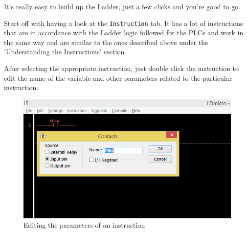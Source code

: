 \documentclass[12pt]{article}
\begin{document}
It's really easy to build up the Ladder, just a few clicks and you're good to go. 

Start off with having a look at the \texttt{Instruction} tab. It has a lot of instructions that are in accordance with the Ladder logic followed for the PLCs and work in the same way and are similar to the ones described above under the 'Understanding the Instructions' section. 

After selecting the appropriate instruction, just double click the instruction to edit the name of the variable and other parameters related to the particular instruction.\vspace{12pt}
\begin{figure}[h!]
\centering
\includegraphics[scale=0.8]{change.png}
\caption{Editing the parameters of an instruction}
\end{figure}
\end{document}

